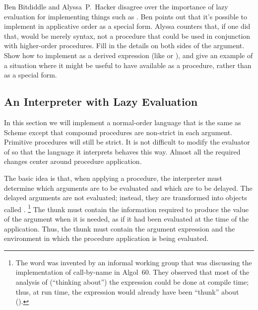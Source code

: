 \begin{exercise}
	\label{Exercise 4.26}
	Ben Bitdiddle and Alyssa P. Hacker disagree over the importance of lazy evaluation for implementing things such as .
	Ben points out that it’s possible to implement  in applicative order as a special form.
	Alyssa counters that, if one did that,  would be merely syntax, not a procedure that could be used in conjunction with higher-order procedures.
	Fill in the details on both sides of the argument.
	Show how to implement  as a derived expression (like  or ), and give an example of a situation where it might be useful to have  available as a procedure, rather than as a special form.
\end{exercise}



\subsection{An Interpreter with Lazy Evaluation}
\label{Section 4.2.2}

In this section we will implement a normal-order language that is the same as Scheme except that compound procedures are non-strict in each argument.
Primitive procedures will still be strict.
It is not difficult to modify the evaluator of  so that the language it interprets behaves this way.
Almost all the required changes center around procedure application.

The basic idea is that, when applying a procedure, the interpreter must determine which arguments are to be evaluated and which are to be delayed.
The delayed arguments are not evaluated;
instead, they are transformed into objects called .%
\footnote{
	The word  was invented by an informal working group that was discussing the implementation of call-by-name in Algol~60.
	They observed that most of the analysis of (“thinking about”) the expression could be done at compile time;
	thus, at run time, the expression would already have been “thunk” about ().
}
The thunk must contain the information required to produce the value of the argument when it is needed, as if it had been evaluated at the time of the application.
Thus, the thunk must contain the argument expression and the environment in which the procedure application is being evaluated.

